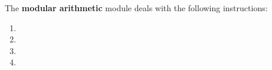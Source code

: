 The \textbf{modular arithmetic} module deals with the following instructions:
\begin{multicols}{2}
\begin{enumerate}
	\item {}
	\item {}
	\item {}
	\item {}
\end{enumerate}
\end{multicols}